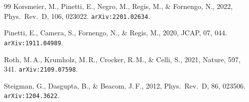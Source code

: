 \documentclass[10pt,a4paper]{article}
\begin{document}
\begin{thebibliography}{99}
Korsmeier, M., Pinetti, E., Negro, M., Regis, M., \& Fornengo, N., 2022, Phys.\ Rev.\ D, 106, 023022.
\texttt{arXiv:2201.02634}.

Pinetti, E., Camera, S., Fornengo, N., \& Regis, M., 2020, JCAP, 07, 044.
\texttt{arXiv:1911.04989}.

Roth, M.\,A., Krumholz, M.\,R., Crocker, R.\,M., \& Celli, S., 2021, Nature, 597, 341.
\texttt{arXiv:2109.07598}.

Steigman, G., Dasgupta, B., \& Beacom, J.\,F., 2012, Phys.\ Rev.\ D, 86, 023506.
\texttt{arXiv:1204.3622}.


\end{thebibliography}
\end{document}
